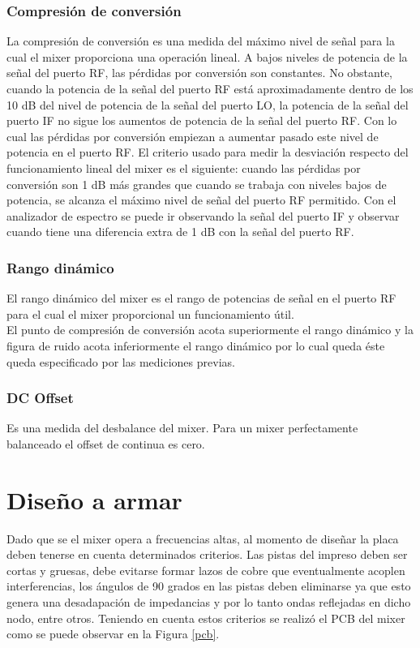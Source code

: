 \documentclass[a4paper,10pt]{article}
\begin{document}
	\subsubsection{Compresi\'on de conversi\'on}
	\indent La compresi\'on de conversi\'on es una medida del m\'aximo nivel de 
	se\~nal para la cual el mixer proporciona una operaci\'on lineal. A bajos 
	niveles de potencia de la se\~nal del puerto RF, las p\'erdidas por 
	conversi\'on son constantes. No obstante, cuando la potencia de la se\~nal 
	del puerto RF est\'a aproximadamente dentro de los 10 dB del nivel de 
	potencia de la se\~nal del puerto LO, la potencia de la se\~nal del puerto 
	IF no sigue los aumentos de potencia de la se\~nal del puerto RF. Con lo 
	cual las p\'erdidas por conversi\'on empiezan a aumentar pasado este nivel 
	de potencia en el puerto RF. El criterio usado para medir la desviaci\'on 
	respecto del funcionamiento lineal del mixer es el siguiente: cuando las 
	p\'erdidas por conversi\'on son 1 dB m\'as grandes que cuando se trabaja con
	niveles bajos de potencia, se alcanza el m\'aximo nivel de se\~nal del 
	puerto RF permitido. Con el analizador de espectro se puede ir observando la
	se\~nal del puerto IF y observar cuando tiene una diferencia extra de 1 dB 
	con la se\~nal del puerto RF. 
		
	\subsubsection{Rango din\'amico}
	\indent	El rango din\'amico del mixer es el rango de potencias de se\~nal en
	el puerto RF para el cual el mixer proporcional un funcionamiento \'util. \\
	\indent	El punto de compresi\'on de conversi\'on acota superiormente el 
	rango din\'amico y la figura de ruido acota inferiormente el rango 
	din\'amico por lo cual queda \'este queda especificado por las mediciones 
	previas.

	\subsubsection{DC Offset}
	\indent Es una medida del desbalance del mixer. Para un mixer perfectamente 
	balanceado el offset de continua es cero.

	\section{Diseño a armar}
	\indent Dado que se el mixer opera a frecuencias altas, al momento de 
	dise\~nar la placa deben tenerse en cuenta determinados criterios. Las 
	pistas del impreso deben ser cortas y gruesas, debe evitarse formar lazos de
	cobre que eventualmente acoplen interferencias, los \'angulos de 90 grados 
	en las pistas deben eliminarse ya que esto genera una desadapaci\'on de 
	impedancias y por lo tanto ondas reflejadas en dicho nodo, entre otros. 
	Teniendo en cuenta estos criterios se realiz\'o el PCB del mixer como se 
	puede observar en la Figura \ref{pcb}. \\
	
\end{document}
